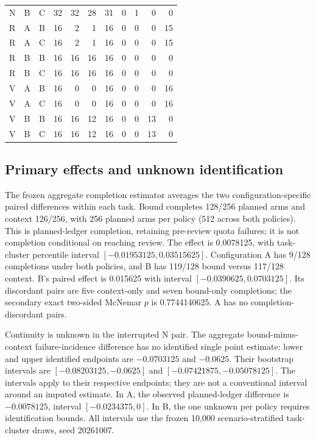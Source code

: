 \documentclass[11pt,a4paper]{article}
\begin{document}
\begin{longtable}{@{}lllrrrrrrrr@{}}
N & B & C & 32 & 32 & 28 & 31 & 0 & 1 & 0 & 0 \\
R & A & B & 16 & 2 & 1 & 16 & 0 & 0 & 0 & 15 \\
R & A & C & 16 & 2 & 1 & 16 & 0 & 0 & 0 & 15 \\
R & B & B & 16 & 16 & 16 & 16 & 0 & 0 & 0 & 0 \\
R & B & C & 16 & 16 & 16 & 16 & 0 & 0 & 0 & 0 \\
V & A & B & 16 & 0 & 0 & 16 & 0 & 0 & 0 & 16 \\
V & A & C & 16 & 0 & 0 & 16 & 0 & 0 & 0 & 16 \\
V & B & B & 16 & 16 & 12 & 16 & 0 & 0 & 13 & 0 \\
V & B & C & 16 & 16 & 12 & 16 & 0 & 0 & 13 & 0 \\
\bottomrule\end{longtable}

\subsection{Primary effects and unknown identification}
The frozen aggregate completion estimator averages the two configuration-specific paired differences within each task. Bound completes 128/256 planned arms and context 126/256, with 256 planned arms per policy (512 across both policies). This is planned-ledger completion, retaining pre-review quota failures; it is not completion conditional on reaching review. The effect is 0.0078125, with task-cluster percentile interval $[-0.01953125,0.03515625]$. Configuration A has 9/128 completions under both policies, and B has 119/128 bound versus 117/128 context. B's paired effect is 0.015625 with interval $[-0.0390625,0.0703125]$. Its discordant pairs are five context-only and seven bound-only completions; the secondary exact two-sided McNemar $p$ is 0.7744140625. A has no completion-discordant pairs.

Continuity is unknown in the interrupted N pair. The aggregate bound-minus-context failure-incidence difference has no identified single point estimate: lower and upper identified endpoints are $-0.0703125$ and $-0.0625$. Their bootstrap intervals are $[-0.08203125,-0.0625]$ and $[-0.07421875,-0.05078125]$. The intervals apply to their respective endpoints; they are not a conventional interval around an imputed estimate. In A, the observed planned-ledger difference is $-0.0078125$, interval $[-0.0234375,0]$. In B, the one unknown per policy requires identification bounds. All intervals use the frozen 10,000 scenario-stratified task-cluster draws, seed 20261007.
\end{document}
